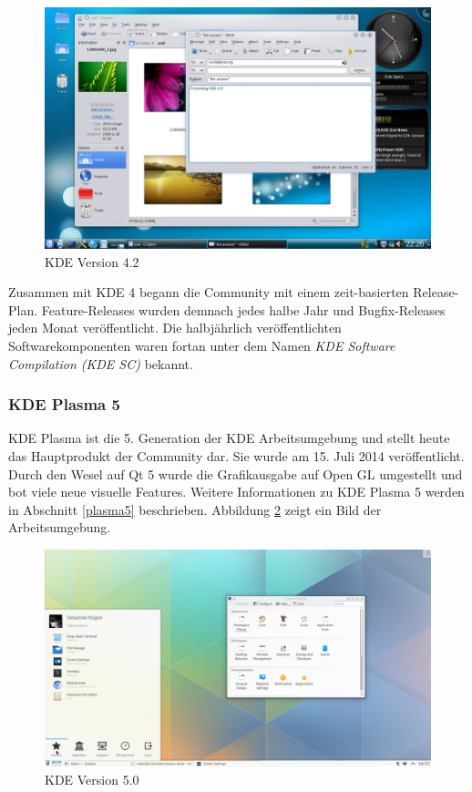 \begin{figure}[h]
	\centering
	\includegraphics[width=\linewidth]{images/kde4.jpeg}
	\caption{KDE Version 4.2 \cite{geschichtekde}}
	\label{fig:kdeversion4}
\end{figure}

Zusammen mit KDE 4 begann die Community mit einem zeit-basierten Release-Plan. Feature-Releases wurden demnach jedes halbe Jahr und Bugfix-Releases jeden Monat veröffentlicht. Die halbjährlich veröffentlichten Softwarekomponenten waren fortan unter dem Namen \textit{KDE Software Compilation (KDE SC)} bekannt. \cite{geschichtekde}

\subsubsection{KDE Plasma 5}
KDE Plasma ist die 5. Generation der KDE Arbeitsumgebung und stellt heute das Hauptprodukt der Community dar. Sie wurde am 15. Juli 2014 veröffentlicht. Durch den Wesel auf Qt 5 wurde die Grafikausgabe auf Open GL umgestellt und bot viele neue visuelle Features. \cite{kdeplasma5} Weitere Informationen zu KDE Plasma 5 werden in Abschnitt \ref{plasma5} beschrieben. Abbildung \ref{fig:kdeversion5} zeigt ein Bild der Arbeitsumgebung.

\begin{figure}[h]
	\centering
	\includegraphics[width=\linewidth]{images/kde5.png}
	\caption{KDE Version 5.0 \cite{kdeplasma5}}
	\label{fig:kdeversion5}
\end{figure}
